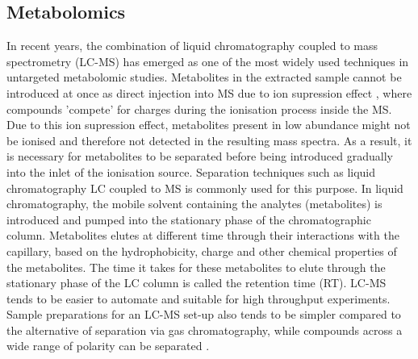\subsection{Metabolomics\label{metabolomics}}

In recent years, the combination of liquid chromatography coupled to mass spectrometry (LC-MS) has emerged as one of the most widely used techniques in untargeted metabolomic studies. Metabolites in the extracted sample cannot be introduced at once as direct injection into MS due to ion supression effect \cite{Annesley2003}, where compounds 'compete' for charges during the ionisation process inside the MS. Due to this ion supression effect, metabolites present in low abundance might not be ionised and therefore not detected in the resulting mass spectra. As a result, it is necessary for metabolites to be separated before being introduced gradually into the inlet of the ionisation source. Separation techniques such as liquid chromatography LC coupled to MS is commonly used for this purpose. In liquid chromatography, the mobile solvent containing the analytes (metabolites) is introduced and pumped into the stationary phase of the chromatographic column. Metabolites elutes at different time through their interactions with the capillary, based on the hydrophobicity, charge and other chemical properties of the metabolites. The time it takes for these metabolites to elute through the stationary phase of the LC column is called the retention time (RT). LC-MS tends to be easier to automate and suitable for high throughput experiments. Sample preparations for an LC-MS set-up also tends to be simpler compared to the alternative of separation via gas chromatography, while compounds across a wide range of polarity can be separated \cite{Hoffmann2007}. 

